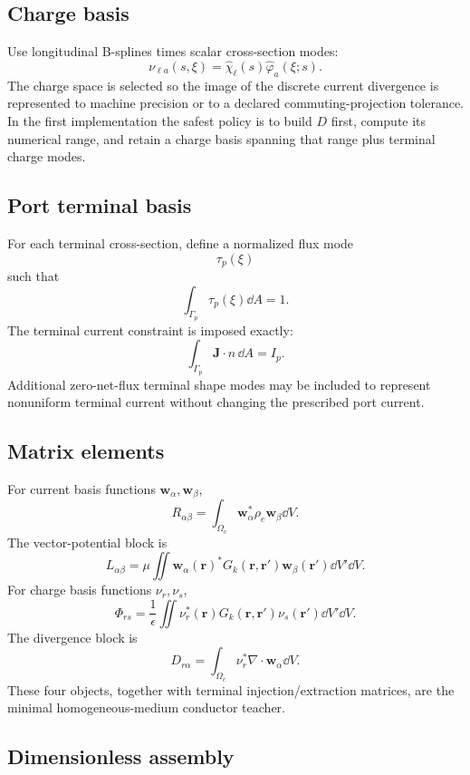 \subsection{Charge basis}

Use longitudinal B-splines times scalar cross-section modes:
\[
 \nu_{\ell a}(s,\xi)
 =
 \widehat\chi_\ell(s)\widehat\varphi_a(\xi;s).
\]
The charge space is selected so the image of the discrete current divergence is
represented to machine precision or to a declared commuting-projection
tolerance. In the first implementation the safest policy is to build $D$ first,
compute its numerical range, and retain a charge basis spanning that range plus
terminal charge modes.

\subsection{Port terminal basis}

For each terminal cross-section, define a normalized flux mode
\[
 \tau_p(\xi)
\]
such that
\[
 \int_{\Gamma_p}\tau_p(\xi)\dd A=1.
\]
The terminal current constraint is imposed exactly:
\[
 \int_{\Gamma_p}\mathbf J\cdot n\,\dd A=I_p.
\]
Additional zero-net-flux terminal shape modes may be included to represent
nonuniform terminal current without changing the prescribed port current.

\subsection{Matrix elements}

For current basis functions $\mathbf w_\alpha,\mathbf w_\beta$,
\[
 R_{\alpha\beta}
 =
 \int_{\Omega_c}
 \mathbf w_\alpha^\ast
 \rho_e
 \mathbf w_\beta
 \dd V.
\]
The vector-potential block is
\[
 L_{\alpha\beta}
 =
 \mu
 \iint
 \mathbf w_\alpha(\mathbf r)^\ast
 G_k(\mathbf r,\mathbf r')
 \mathbf w_\beta(\mathbf r')
 \dd V'\dd V.
\]
For charge basis functions $\nu_r,\nu_s$,
\[
 \Phi_{rs}
 =
 \frac{1}{\epsilon}
 \iint
 \nu_r^\ast(\mathbf r)
 G_k(\mathbf r,\mathbf r')
 \nu_s(\mathbf r')
 \dd V'\dd V.
\]
The divergence block is
\[
 D_{r\alpha}
 =
 \int_{\Omega_c}
 \nu_r^\ast
 \nabla\cdot\mathbf w_\alpha
 \dd V.
\]
These four objects, together with terminal injection/extraction matrices, are
the minimal homogeneous-medium conductor teacher.

\subsection{Dimensionless assembly}


